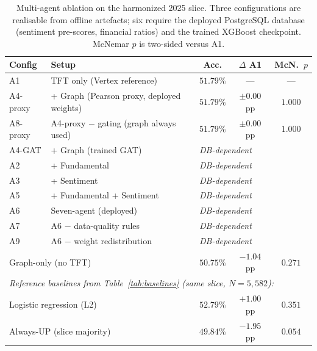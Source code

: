 \documentclass[conference]{IEEEtran}
\begin{document}
\begin{table}[htbp]
\centering
\caption{Multi-agent ablation on the harmonized 2025 slice. Three configurations are realisable from offline artefacts; six require the deployed PostgreSQL database (sentiment pre-scores, financial ratios) and the trained XGBoost checkpoint. McNemar $p$ is two-sided versus A1.}
\label{tab:multiagent_ablation}
\scriptsize
\setlength{\tabcolsep}{4pt}
\begin{tabular}{llccc}
\toprule
\textbf{Config} & \textbf{Setup} & \textbf{Acc.} & \textbf{$\Delta$ A1} & \textbf{McN.\ $p$} \\
\midrule
A1        & TFT only (Vertex reference)                 & $\mathbf{51.79\%}$ & ---             & ---       \\
A4-proxy  & + Graph (Pearson proxy, deployed weights)   & $51.79\%$ & $\pm 0.00$ pp   & $1.000$   \\
A8-proxy  & A4-proxy $-$ gating (graph always used)     & $51.79\%$ & $\pm 0.00$ pp   & $1.000$   \\
\midrule
A4-GAT    & + Graph (trained GAT)                       & \multicolumn{3}{l}{\textit{DB-dependent}} \\
A2        & + Fundamental                                & \multicolumn{3}{l}{\textit{DB-dependent}} \\
A3        & + Sentiment                                  & \multicolumn{3}{l}{\textit{DB-dependent}} \\
A5        & + Fundamental + Sentiment                    & \multicolumn{3}{l}{\textit{DB-dependent}} \\
A6        & Seven-agent (deployed)                       & \multicolumn{3}{l}{\textit{DB-dependent}} \\
A7        & A6 $-$ data-quality rules                    & \multicolumn{3}{l}{\textit{DB-dependent}} \\
A9        & A6 $-$ weight redistribution                 & \multicolumn{3}{l}{\textit{DB-dependent}} \\
\midrule
\multicolumn{2}{l}{Graph-only (no TFT)}                  & $50.75\%$ & $-1.04$ pp      & $0.271$   \\
\midrule
\multicolumn{5}{l}{\textit{Reference baselines from Table~\ref{tab:baselines} (same slice, $N=5{,}582$):}} \\
\multicolumn{2}{l}{Logistic regression (L2)}              & $52.79\%$ & $+1.00$ pp      & $0.351$   \\
\multicolumn{2}{l}{Always-UP (slice majority)}            & $49.84\%$ & $-1.95$ pp      & $0.054$   \\
\bottomrule
\end{tabular}
\end{table}
\end{document}
